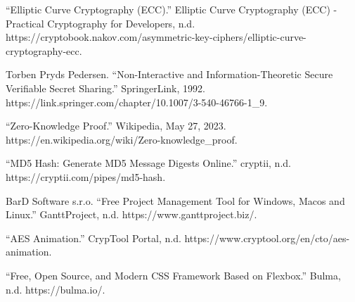 \begin{thebibliography}{9}
“Elliptic Curve Cryptography (ECC).” Elliptic Curve Cryptography (ECC) - Practical Cryptography for Developers, n.d. https://cryptobook.nakov.com/asymmetric-key-ciphers/elliptic-curve-cryptography-ecc. 

Torben Pryds Pedersen. “Non-Interactive and Information-Theoretic Secure Verifiable Secret Sharing.” SpringerLink, 1992. https://link.springer.com/chapter/10.1007/3-540-46766-1\_9. 

“Zero-Knowledge Proof.” Wikipedia, May 27, 2023. https://en.wikipedia.org/wiki/Zero-knowledge\_proof. 

“MD5 Hash: Generate MD5 Message Digests Online.” cryptii, n.d. https://cryptii.com/pipes/md5-hash. 

BarD Software s.r.o. “Free Project Management Tool for Windows, Macos and Linux.” GanttProject, n.d. https://www.ganttproject.biz/. 

“AES Animation.” CrypTool Portal, n.d. https://www.cryptool.org/en/cto/aes-animation. 

“Free, Open Source, and Modern CSS Framework Based on Flexbox.” Bulma, n.d. https://bulma.io/.
\end{thebibliography}